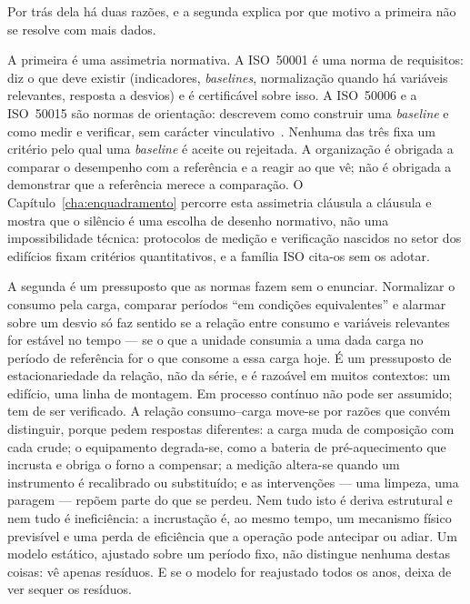 Por trás dela há duas razões, e a segunda explica por que motivo a
primeira não se resolve com mais dados.

A primeira é uma assimetria normativa. A ISO~50001 é uma norma de
requisitos: diz o que deve existir (indicadores, \emph{baselines},
normalização quando há variáveis relevantes, resposta a desvios) e é
certificável sobre isso. A ISO~50006 e a ISO~50015 são normas de
orientação: descrevem como construir uma \emph{baseline} e como medir e
verificar, sem carácter vinculativo~\cite{ISO50006_2014,ISO50015_2014}.
Nenhuma das três fixa um critério pelo qual uma \emph{baseline} é aceite
ou rejeitada. A organização é obrigada a comparar o desempenho com a
referência e a reagir ao que vê; não é obrigada a demonstrar que a
referência merece a comparação. O Capítulo~\ref{cha:enquadramento}
percorre esta assimetria cláusula a cláusula e mostra que o silêncio é
uma escolha de desenho normativo, não uma impossibilidade técnica:
protocolos de medição e verificação nascidos no setor dos edifícios
fixam critérios quantitativos, e a família ISO cita-os sem os adotar.

A segunda é um pressuposto que as normas fazem sem o enunciar.
Normalizar o consumo pela carga, comparar períodos \enquote{em condições
equivalentes} e alarmar sobre um desvio só faz sentido se a relação
entre consumo e variáveis relevantes for estável no tempo --- se o que
a unidade consumia a uma dada carga no período de referência for o que
consome a essa carga hoje. É um pressuposto de estacionariedade da
relação, não da série, e é razoável em muitos contextos: um edifício,
uma linha de montagem. Em processo contínuo não pode ser assumido; tem
de ser verificado. A relação consumo--carga move-se por razões que
convém distinguir, porque pedem respostas diferentes: a carga muda de
composição com cada crude; o equipamento degrada-se, como a bateria de
pré-aquecimento que incrusta e obriga o forno a compensar; a medição
altera-se quando um instrumento é recalibrado ou substituído; e as
intervenções --- uma limpeza, uma paragem --- repõem parte do que se
perdeu. Nem tudo isto é deriva estrutural e nem tudo é ineficiência: a
incrustação é, ao mesmo tempo, um mecanismo físico previsível e uma
perda de eficiência que a operação pode antecipar ou adiar. Um modelo
estático, ajustado sobre um período fixo, não distingue nenhuma destas
coisas: vê apenas resíduos. E se o modelo for reajustado todos os anos,
deixa de ver sequer os resíduos.


